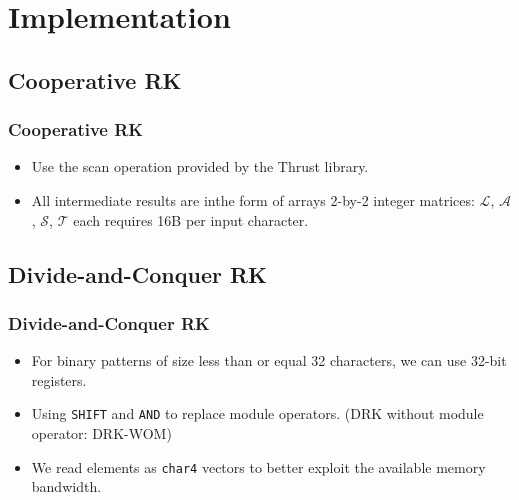 \section{Implementation}

\subsection{Cooperative RK}
\begin{frame}
	\frametitle{Cooperative RK}
	\begin{itemize}
		\setlength\itemsep{1em}
		\item Use the scan operation provided by the Thrust library.
		\item All intermediate results are inthe form of arrays 2-by-2 
		integer matrices: $\mathcal{L}$, $\mathcal{A}$, $\mathcal{S}$,
		$\mathcal{T}$ each requires 16B per input character.
	\end{itemize}
\end{frame}

\subsection{Divide-and-Conquer RK}
\begin{frame}
	\frametitle{Divide-and-Conquer RK}
	\begin{itemize}
		\setlength\itemsep{1em}
		\item For binary patterns of size less than or equal 32 
		characters, we can use 32-bit registers.
		\item Using \texttt{SHIFT} and \texttt{AND} to replace module operators.
		(DRK without module operator: DRK-WOM)
		\item We read elements as \texttt{char4} vectors to better
		exploit the available memory bandwidth.
	\end{itemize}
\end{frame}
